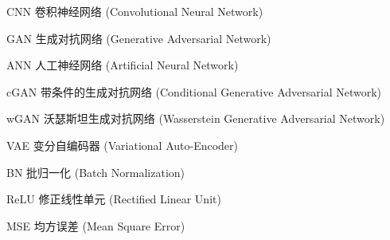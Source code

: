 \begin{denotation}[3cm]
\item[CNN] 卷积神经网络 (Convolutional Neural Network)
\item[GAN] 生成对抗网络 (Generative Adversarial Network)
\item[ANN] 人工神经网络 (Artificial Neural Network)
\item[cGAN] 带条件的生成对抗网络 (Conditional Generative Adversarial Network)
\item[wGAN] 沃瑟斯坦生成对抗网络 (Wasserstein Generative Adversarial Network)
\item[VAE] 变分自编码器 (Variational Auto-Encoder)
\item[BN] 批归一化 (Batch Normalization)
\item[ReLU] 修正线性单元 (Rectified Linear Unit)
\item[MSE] 均方误差 (Mean Square Error)
\end{denotation}
